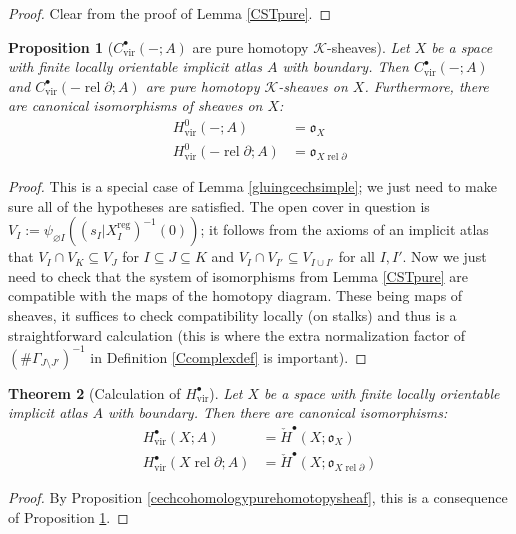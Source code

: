 \documentclass[12pt]{article}
\newtheorem{theorem}{Theorem}[subsection]
\newtheorem{proposition}[theorem]{Proposition}
\theoremstyle{definition}
\theoremstyle{remark}
\numberwithin{equation}{subsection}
\newcommand{\K}{\mathcal K}
\newcommand{\oo}{\mathfrak o}
\newcommand{\cH}{\check H}
\newcommand{\vir}{\mathrm{vir}}
\newcommand{\reg}{\mathrm{reg}}
\newcommand{\rel}{\operatorname{rel}}
\begin{document}
\begin{proof}
Clear from the proof of Lemma \ref{CSTpure}.
\end{proof}

\begin{proposition}[$C^\bullet_\vir(-;A)$ are pure homotopy $\K$-sheaves]\label{Cpure}
Let $X$ be a space with finite locally orientable implicit atlas $A$ with boundary.  Then $C^\bullet_\vir(-;A)$ and $C^\bullet_\vir(-\rel\partial;A)$ are pure homotopy $\K$-sheaves on $X$.  Furthermore, there are canonical isomorphisms of sheaves on $X$:
\begin{align}
\label{FisoI}H^0_\vir(-;A)&=\oo_X\\
\label{FisoII}H^0_\vir(-\rel\partial;A)&=\oo_{X\rel\partial}
\end{align}
\end{proposition}

\begin{proof}
This is a special case of Lemma \ref{gluingcechsimple}; we just need to make sure all of the hypotheses are satisfied.  The open cover in question is $V_I:=\psi_{\varnothing I}((s_I|X_I^\reg)^{-1}(0))$; it follows from the axioms of an implicit atlas that $V_I\cap V_K\subseteq V_J$ for $I\subseteq J\subseteq K$ and $V_I\cap V_{I'}\subseteq V_{I\cup I'}$ for all $I,I'$.  Now we just need to check that the system of isomorphisms from Lemma \ref{CSTpure} are compatible with the maps of the homotopy diagram.  These being maps of sheaves, it suffices to check compatibility locally (on stalks) and thus is a straightforward calculation (this is where the extra normalization factor of $(\#\Gamma_{J\setminus J'})^{-1}$ in Definition \ref{Ccomplexdef} is important).
\end{proof}

\begin{theorem}[Calculation of $H^\bullet_\vir$]\label{Fsheaffundamentaliso}
Let $X$ be a space with finite locally orientable implicit atlas $A$ with boundary.  Then there are canonical isomorphisms:
\begin{align}
H^\bullet_\vir(X;A)&=\cH^\bullet(X;\oo_X)\\
H^\bullet_\vir(X\rel\partial;A)&=\cH^\bullet(X;\oo_{X\rel\partial})
\end{align}
\end{theorem}

\begin{proof}
By Proposition \ref{cechcohomologypurehomotopysheaf}, this is a consequence of Proposition \ref{Cpure}.
\end{proof}
\end{document}
